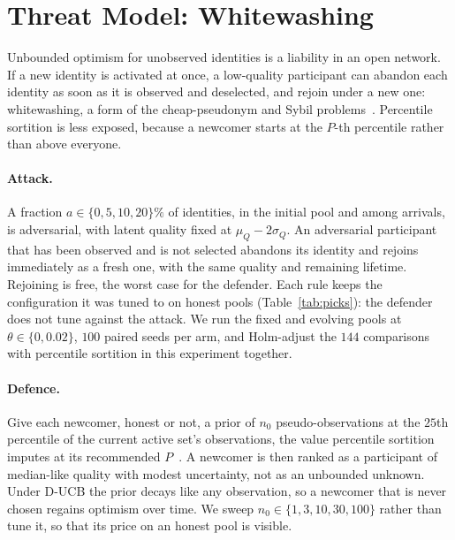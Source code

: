 \documentclass[sigconf,anonymous,review,nonacm]{acmart}
\begin{document}
\section{Threat Model: Whitewashing}
\label{sec:attack}

Unbounded optimism for unobserved identities is a liability in an open network. If a new
identity is activated at once, a low-quality participant can abandon each identity as soon
as it is observed and deselected, and rejoin under a new one: whitewashing, a form of the
cheap-pseudonym and Sybil problems~\cite{friedman2001pseudonyms,douceur2002sybil,feldman2006freeriding}.
Percentile sortition is less exposed, because a newcomer starts at the $P$-th percentile
rather than above everyone.

\paragraph{Attack.} A fraction $a\in\{0,5,10,20\}\%$ of identities, in the initial pool and
among arrivals, is adversarial, with latent quality fixed at $\mu_Q-2\sigma_Q$. An
adversarial participant that has been observed and is not selected abandons its identity and
rejoins immediately as a fresh one, with the same quality and remaining lifetime. Rejoining is
free, the worst case for the defender. Each rule keeps the configuration it was tuned to on
honest pools (Table~\ref{tab:picks}): the defender does not tune against the attack. We run
the fixed and evolving pools at $\theta\in\{0,0.02\}$, $100$ paired seeds per arm, and
Holm-adjust the $144$ comparisons with percentile sortition in this experiment together.

\paragraph{Defence.} Give each newcomer, honest or not, a prior of $n_0$ pseudo-observations at
the $25$th percentile of the current active set's observations, the value percentile
sortition imputes at its recommended $P$~\cite{kruijssen2024}. A newcomer is then
ranked as a participant of median-like quality with modest uncertainty, not as an
unbounded unknown. Under D-UCB the prior decays like any observation, so a newcomer that is
never chosen regains optimism over time. We sweep $n_0\in\{1,3,10,30,100\}$ rather than
tune it, so that its price on an honest pool is visible.

\begin{table}[t]\centering\small
\caption{Whitewashing. For each pool and drift rate: $M_1$ without attack ($a=0$) and with a
fifth of identities adversarial ($a=20\%$), and the adversaries' share of the active set at
$a=20\%$ (\%). Percentile sortition is given as $M_1$; every other rule as its paired
difference from percentile sortition in units of $10^{-3}$. \textbf{Bold}: win,
\underline{underlined}: loss (Holm-adjusted $p<0.05$ over $144$ comparisons). Rows marked
$+n_0$ add the newcomer prior to D-UCB's tuned configuration.}
\label{tab:attack}
\setlength{\tabcolsep}{3pt}

\end{table}
\end{document}
